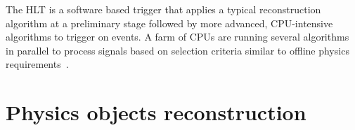 The HLT is a software based trigger that applies a typical reconstruction algorithm at a preliminary stage 
followed by more advanced, CPU-intensive algorithms to trigger on events. A farm of CPUs are running several
algorithms in parallel to process signals based on selection criteria similar to offline physics requirements~\cite{C-Gabaldon_2012}.   

\section{Physics objects reconstruction}